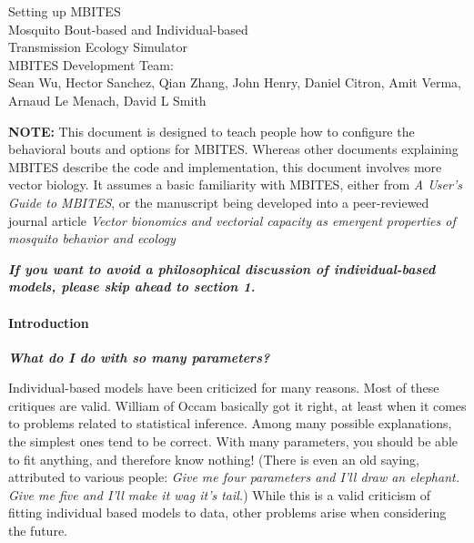 \documentclass{article}
\begin{document}


\begin{centering}
\huge{Setting up MBITES}\\
\vspace{0.3in}
\Large{Mosquito Bout-based and Individual-based \\ Transmission Ecology Simulator}\\

\vspace{0.3in}
\large{MBITES Development Team: \\ Sean Wu, Hector Sanchez, Qian Zhang, John Henry, Daniel Citron, Amit Verma, Arnaud Le Menach, David L Smith\\}

\end{centering}

\vspace{0.3in}

{\bf NOTE:} This document is designed to teach people how to configure the behavioral bouts and options for MBITES. Whereas other documents explaining MBITES describe the code and implementation, this document involves more vector biology. It assumes a basic familiarity with MBITES, either from {\em A User's Guide to MBITES}, or the manuscript being developed into a peer-reviewed journal article {\em Vector bionomics and vectorial capacity as emergent properties of mosquito behavior and ecology}

\clearpage 

\begin{displayquote}
{\bf \em If you want to avoid a philosophical discussion of individual-based models, please skip ahead to section 1.}
\end{displayquote}
\paragraph{Introduction} 

\begin{displayquote}
{\bf \em What do I do with so many parameters?}
\end{displayquote}

Individual-based models have been criticized for many reasons. Most of these critiques are valid. William of Occam basically got it right, at least when it comes to problems related to statistical inference. Among many possible explanations, the simplest ones tend to be correct. With many parameters, you should be able to fit anything, and therefore know nothing! (There is even an old saying, attributed to various people: {\em Give me four parameters and I'll draw an elephant. Give me five and I'll make it wag it's tail.})  While this is a valid criticism of fitting individual based models to data, other problems arise when considering the future.
\end{document}
